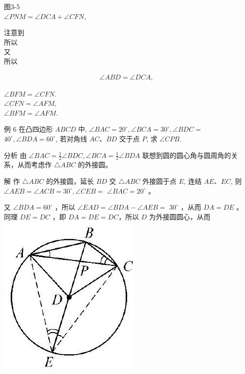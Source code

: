 \documentclass[10pt]{article}
\begin{document}
图3-5\\
$\angle P N M=\angle D C A+\angle C F N$,

注意到\\
所以\\
又\\
所以

\begin{align*}
\angle A B D=\angle D C A,
\end{align*}

$\angle B F M=\angle C F N$.\\
$\angle C F N=\angle A F M$,\\
$\angle B F M=\angle A F M$.

例 6 在凸四边形 $A B C D$ 中, $\angle B A C=20^{\circ}, \angle B C A=30^{\circ}, \angle B D C=$ $40^{\circ}, \angle B D A=60^{\circ}$, 若对角线 $A C 、 B D$ 交于点 $P$, 求 $\angle C P B$.

分析 由 $\angle B A C=\frac{1}{2} \angle B D C, \angle B C A=\frac{1}{2} \angle B D A$ 联想到圆的圆心角与圆周角的关系，从而考虑作 $\triangle A B C$ 的外接圆。

解 作 $\triangle A B C$ 的外接圆，延长 $B D$ 交 $\triangle A B C$ 外接圆于点 $E$, 连结 $A E 、 E C$, 则 $\angle A E B=\angle A C B=30^{\circ}, \angle C E B=$ $\angle B A C=20^{\circ}$ 。

又 $\angle B D A=60^{\circ}$ ，所以 $\angle E A D=\angle B D A-\angle A E B=$ $30^{\circ}$ ，从而 $D A=D E$ 。同理 $D E=D C$ ，即 $D A=D E=D C ，$所以 $D$ 为外接圆圆心，从而\\
\includegraphics[max width=\textwidth, center]{2024_10_30_66b8e5e701da2093c133g-025(1)}
\end{document}
